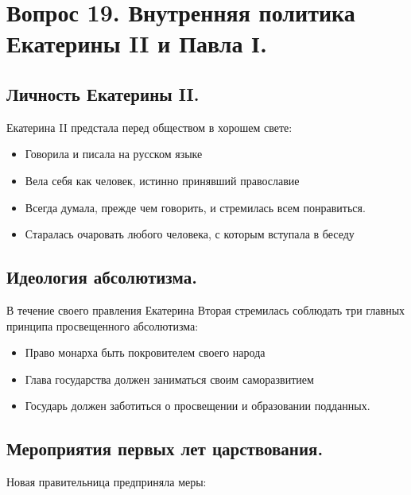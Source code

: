 \section{Вопрос 19. Внутренняя политика Екатерины II и Павла І.}

\subsection{Личность Екатерины II.}

Екатерина II предстала перед обществом в хорошем свете:

\begin{itemize}
    \item{ Говорила и писала на русском языке }
    \item{ Вела себя как человек, истинно принявший православие }
    \item{ Всегда думала, прежде чем говорить, и стремилась всем понравиться.  }
    \item{ Старалась очаровать любого человека, с которым вступала в беседу }
\end{itemize}

\subsection{Идеология абсолютизма.}

В течение своего правления Екатерина Вторая стремилась соблюдать три главных принципа просвещенного абсолютизма:

\begin{itemize}
    \item{ Право монарха быть покровителем своего народа }
    \item{ Глава государства должен заниматься своим саморазвитием }
    \item{ Государь должен заботиться о просвещении и образовании подданных. }
\end{itemize}

\subsection{Мероприятия первых лет царствования.}

Новая правительница предприняла меры:

